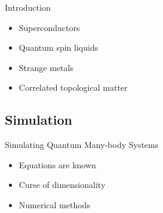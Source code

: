 \begin{frame}{Introduction}
\begin{itemize}
{\begin{itemize}
                      \item Superconductors
                      \item Quantum  spin  liquids
                      \item Strange metals
                      \item Correlated topological matter
                  \end{itemize}
              }
    \end{itemize}

\end{frame}

\subsection{Simulation}

\begin{frame}{Simulating Quantum Many-body Systems}
    \begin{itemize}
        \item Equations are known
        \item Curse of dimensionality
        \item Numerical methods
    \end{itemize}
\end{frame}

